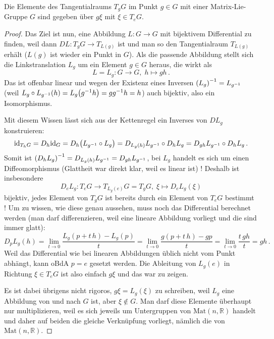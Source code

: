 \documentclass[../H_Analysis_main.tex]{subfiles}
\begin{document}
\begin{satz}\label{satz:tangraummlg}
Die Elemente des Tangentialraums $T_g G$ im Punkt $g \in G$ mit einer Matrix-Lie-Gruppe $G$ sind gegeben über $g \xi$ mit $\xi \in T_e G$.
\end{satz}
\begin{proof}
Das Ziel ist nun, eine Abbildung $L: G \rightarrow G$ mit bijektivem Differential zu finden, weil dann $DL: T_g G \rightarrow T_{L(g)}$ ist und man so den Tangentialraum $T_{L(g)}$ erhält ($L(g)$ ist wieder ein Punkt in $G$). Als die passende Abbildung stellt sich die Linkstranslation $L_g$ um ein Element $g \in G$ heraus, die wirkt als
\begin{equation}
L = L_g: G \rightarrow G, \; h \mapsto g h \, .
\end{equation}
Das ist offenbar linear und wegen der Existenz eines Inversen $\qty(L_g)^{-1} = L_{g^{-1}}$ (weil $L_g \circ L_{g^{-1}} (h) = L_g \qty(g^{-1} h) = g g^{-1} h = h$) auch bijektiv, also ein Isomorphismus.


Mit diesem Wissen lässt sich aus der Kettenregel ein Inverses von $DL_g$ konstruieren:
\begin{equation*}
\text{id}_{T_h G} = D_h \text{id}_G = D_h \qty(L_{g^{-1}} \circ L_g) = D_{L_g(h)} L_{g^{-1}} \circ D_h L_g = D_{gh} L_{g^{-1}} \circ D_h L_g \, .
\end{equation*}
Somit ist $\qty(D_h L_g)^{-1} = D_{L_g(h)} L_{g^{-1}} = D_{gh} L_{g^{-1}}$, bei $L_g$ handelt es sich um einen Diffeomorphismus (Glattheit war direkt klar, weil es linear ist) ! Deshalb ist insbesondere
\begin{equation}
D_e L_g: T_e G \rightarrow T_{L_g(e)} G = T_g G, \; \xi \mapsto D_e L_g(\xi)
\end{equation}
bijektiv, jedes Element von $T_g G$ ist bereits durch ein Element von $T_e G$ bestimmt ! Um zu wissen, wie diese genau aussehen, muss noch das Differential berechnet werden (man darf differenzieren, weil eine lineare Abbildung vorliegt und die sind immer glatt):
\begin{equation}
D_p L_g (h) = \lim_{t \rightarrow 0} \frac{L_g(p + t \, h) - L_g(p)}{t} = \lim_{t \rightarrow 0} \frac{g(p + t \, h) - gp}{t} = \lim_{t \rightarrow 0} \frac{t \, gh}{t} = gh \, .
\end{equation}
Weil das Differential wie bei linearen Abbildungen üblich nicht vom Punkt abhängt, kann oBdA $p = e$ gesetzt werden. Die Ableitung von $L_g(e)$ in Richtung $\xi \in T_e G$ ist also einfach $g \xi$ und das war zu zeigen.

Es ist dabei übrigens nicht rigoros, $g\xi = L_g(\xi)$ zu schreiben, weil $L_g$ eine Abbildung von und nach $G$ ist, aber $\xi \notin G$. Man darf diese Elemente überhaupt nur multiplizieren, weil es sich jeweils um Untergruppen von $\text{Mat}(n, \mathbb{R})$ handelt und daher auf beiden die gleiche Verknüpfung vorliegt, nämlich die von $\text{Mat}(n, \mathbb{R})$.
\end{proof}
\end{document}
